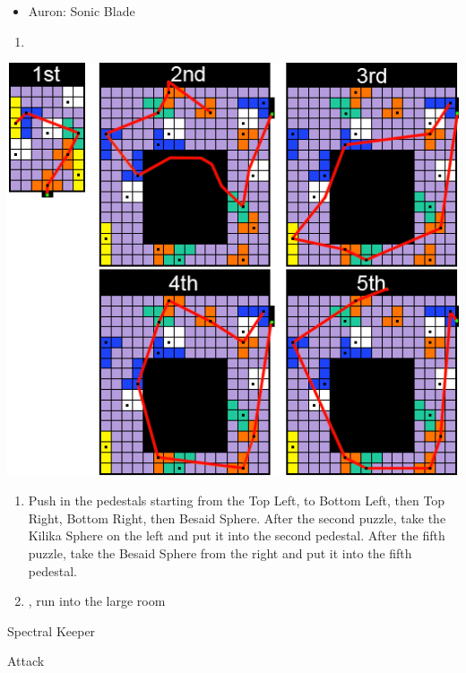 \begin{equip}
	\begin{itemize}
		\item Auron: Sonic Blade
	\end{itemize}
\end{equip}
\begin{enumerate}[resume]
	\item {\large \save}
\end{enumerate}
\includegraphics[width=.95\columnwidth]{graphics/Zanarkand_Trials}
\begin{enumerate}[resume]
	\item Push in the pedestals starting from the Top Left, to Bottom Left, then Top Right, Bottom Right, then Besaid Sphere. After the second puzzle, take the Kilika Sphere on the left and put it into the second pedestal. After the fifth puzzle, take the Besaid Sphere from the right and put it into the fifth pedestal.
	\item \cs, run into the large room
\end{enumerate}
\begin{battle}[52000]{Spectral Keeper}
	\begin{itemize}
		\summon{\bahamut}
		\bahamutf Attack
	\end{itemize}
\end{battle}
\vfill

